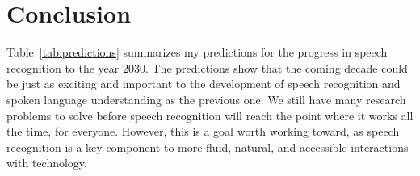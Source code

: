 \section{Conclusion}
\label{sec:conclusion}

Table~\ref{tab:predictions} summarizes my predictions for the progress in
speech recognition to the year 2030. The predictions show that the coming
decade could be just as exciting and important to the development of speech
recognition and spoken language understanding as the previous one. We still
have many research problems to solve before speech recognition will reach the
point where it works all the time, for everyone. However, this is a goal worth
working toward, as speech recognition is a key component to more fluid,
natural, and accessible interactions with technology.
